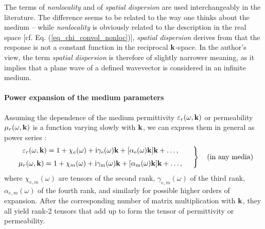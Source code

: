 The terms of \textit{nonlocality} and of \textit{spatial dispersion} are used interchangeably in the literature. The difference seems to be related to the way one thinks about the medium -- while \textit{nonlocality} is obviously related to the description in the real space [cf. Eq. (\ref{eq_chi_convol_nonloc})], \textit{spatial dispersion} derives from that the response is not a constant function in the reciprocal ${\mathbf{k}}$-space. In the author's view, the term \textit{spatial dispersion} is therefore of slightly narrower meaning, as it implies that a plane wave of a defined wavevector is considered in an infinite medium.

\paragraph{Power expansion of the medium parameters} %
Assuming the dependence of the medium permittivity $\varepsilon_r(\omega,{\mathbf{k}})$ or permeability $\mu_r(\omega,{\mathbf{k}})$ is a function varying slowly with ${\mathbf{k}}$, we can express them in general as power series \cite[p. 367]{landau1984electrodynamics}:
\begin{equation} 
\left.  \begin{array}{c}
\epsrn(\omega,\kk) = 1 + \chi_e(\omega) + \ii \gamma_{\text{e}}(\omega) \kk + [\alpha_{\text{e}}(\omega) \kk] \kk + \ldots, \medskip  \\
\murn(\omega,\kk) = 1 + \chi_m(\omega) + \ii \gamma_{\text{m}}(\omega) \kk + [\alpha_{\text{m}}(\omega) \kk] \kk + \ldots, 
\end{array} \quad \right\} \quad \text{(in any media)}
\label{eq_epsmusd1}\end{equation}
where $\chi_{e,m}(\omega)$ are tensors of the second rank, $\gamma_{e,m}(\omega)$ of the third rank, $\alpha_{e,m}(\omega)$ of the fourth rank, and similarly for possible higher orders of expansion. After the corresponding number of matrix multiplication with ${\mathbf{k}}$, they all yield rank-2 tensors that add up to form the tensor of permittivity or permeability.

